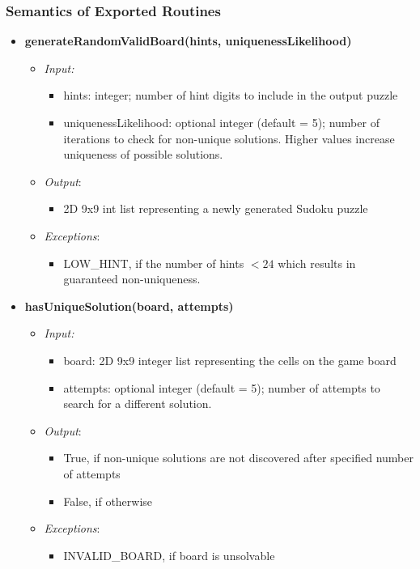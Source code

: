 \documentclass[11pt]{article}
\begin{document}
		\subsubsection{Semantics of Exported Routines}
		\begin{itemize}
		    \item \textbf{generateRandomValidBoard(hints, uniquenessLikelihood)}
		\begin{itemize}
		    \item[] \textit{Input: }
			\begin{itemize}
		        \item hints: integer; number of hint digits to include in the output puzzle
		        \item uniquenessLikelihood: optional integer (default = 5); number of iterations to check for non-unique solutions. Higher values increase uniqueness of possible solutions.
		    \end{itemize}	    
		    
		    \item[] \textit{Output}: 
		    \begin{itemize}
		        \item 2D 9x9 int list representing a newly generated Sudoku puzzle
		    \end{itemize}
		    \item[] \textit{Exceptions}: 
			 \begin{itemize}
		        \item LOW\_HINT, if the number of hints $< 24$ which results in guaranteed non-uniqueness.
		    \end{itemize}	    
		\end{itemize}
		
	    \item \textbf{hasUniqueSolution(board, attempts)}
		\begin{itemize}
		    \item[] \textit{Input: } 
		    \begin{itemize}
		        \item board: 2D 9x9 integer list representing the cells on the game board
		        \item attempts: optional integer (default = 5); number of attempts to search for a different solution.
		    \end{itemize}	  
		    \item[] \textit{Output}: 
		    \begin{itemize}
		        \item True, if non-unique solutions are not discovered after specified number of attempts
		        \item False, if otherwise
		    \end{itemize}
		    \item[] \textit{Exceptions}:
		    \begin{itemize}
		        \item INVALID\_BOARD, if board is unsolvable
		    \end{itemize}
		\end{itemize}
    \end{itemize}
    
\end{document}

